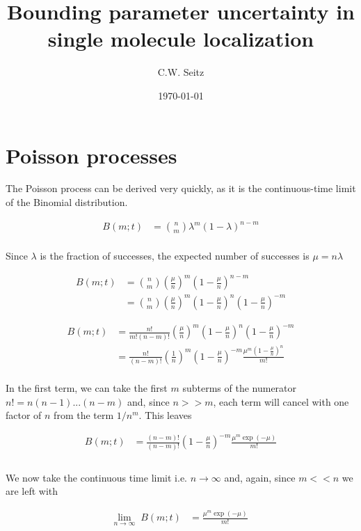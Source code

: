 \documentclass{article}
\title{Bounding parameter uncertainty in single molecule localization}
\author{C.W. Seitz}
\date{\today}
\begin{document}
\maketitle

\section{Poisson processes}

The Poisson process can be derived very quickly, as it is the continuous-time limit of the Binomial distribution.

\begin{align*}
B(m;t) &= {n\choose m}\lambda^{m}(1-\lambda)^{n-m}\\
\end{align*}

Since $\lambda$ is the fraction of successes, the expected number of successes is $\mu = n\lambda$

\begin{align*}
B(m;t) &=  {n\choose m}\left(\frac{\mu}{n}\right)^{m}\left(1-\frac{\mu}{n}\right)^{n-m}\\
&= {n\choose m}\left(\frac{\mu}{n}\right)^{m}\left(1-\frac{\mu}{n}\right)^{n}\left(1-\frac{\mu}{n}\right)^{-m}
\end{align*}

\begin{align*}
B(m;t) &= \frac{n!}{m!(n-m)!}\left(\frac{\mu}{n}\right)^{m}\left(1-\frac{\mu}{n}\right)^{n}\left(1-\frac{\mu}{n}\right)^{-m}\\
&= \frac{n!}{(n-m)!}\left(\frac{1}{n}\right)^{m}\left(1-\frac{\mu}{n}\right)^{-m}\frac{\mu^{m}\left(1-\frac{\mu}{n}\right)^{n}}{m!}\\
\end{align*}

In the first term, we can take the first $m$ subterms of the numerator $n! = n(n-1)...(n-m)$ and, since $n>>m$, each term will cancel with one factor of $n$ from the term $1/n^{m}$. This leaves

\begin{align*}
B(m;t) &= \frac{(n-m)!}{(n-m)!}\left(1-\frac{\mu}{n}\right)^{-m}\frac{\mu^{m}\exp(-\mu)}{m!}\\\\
\end{align*}

We now take the continuous time limit i.e. $n\rightarrow\infty$ and, again, since $m << n$ we are left with 

\begin{align*}
\underset{n\rightarrow\infty}{\mathrm{lim}} \;\; B(m;t) &= \frac{\mu^{m}\exp(-\mu)}{m!}\\
\end{align*}
\end{document}
